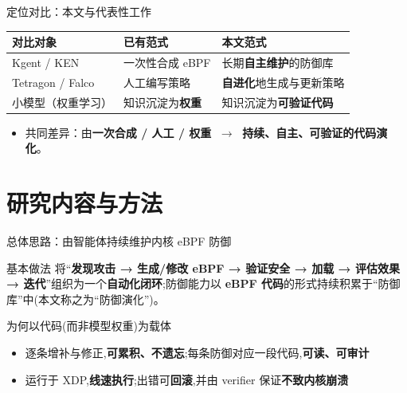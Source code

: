 \documentclass[aspectratio=169,10pt]{beamer}
\begin{document}
\begin{frame}{定位对比：本文与代表性工作}
    \begin{center}
    \renewcommand{\arraystretch}{1.35}
    \footnotesize\kaishu
    \begin{tabular}{>{\raggedright\arraybackslash}p{3.0cm}|>{\raggedright\arraybackslash}p{3.9cm}|>{\raggedright\arraybackslash}p{3.9cm}}
        \toprule
        \textbf{对比对象} & \textbf{已有范式} & \textbf{本文范式} \\
        \midrule
        Kgent / KEN\supercite{yang2024kgent} & 一次性合成 eBPF & \cellcolor{boxbg}长期\textbf{自主维护}的防御库 \\
        Tetragon / Falco\supercite{tetragon2022,falco2018} & 人工编写策略 & \cellcolor{boxbg}\textbf{自进化}地生成与更新策略 \\
        小模型（权重学习） & 知识沉淀为\textbf{权重} & \cellcolor{boxbg}知识沉淀为\textbf{可验证代码} \\
        \bottomrule
    \end{tabular}
    \end{center}
    \vspace{0.4em}
    \begin{itemize}
        \item 共同差异：由\textbf{一次合成 / 人工 / 权重} $\;\longrightarrow\;$ \textbf{持续、自主、可验证的代码演化}。
    \end{itemize}
\end{frame}


\section{研究内容与方法}

\begin{frame}{总体思路：由智能体持续维护内核 eBPF 防御}
    \begin{block}{基本做法}
        将“\textbf{发现攻击 → 生成/修改 eBPF → 验证安全 → 加载 → 评估效果 → 迭代}”组织为一个\textbf{自动化闭环};防御能力以 \textbf{eBPF 代码}的形式持续积累于“防御库”中(本文称之为“防御演化”)。
    \end{block}
    \vspace{0.2em}
    \begin{block}{为何以代码(而非模型权重)为载体}
        \begin{itemize}
            \item 逐条增补与修正,\textbf{可累积、不遗忘};每条防御对应一段代码,\textbf{可读、可审计}
            \item 运行于 XDP,\textbf{线速执行};出错可\textbf{回滚},并由 verifier 保证\textbf{不致内核崩溃}
        \end{itemize}
    \end{block}
\end{frame}
\end{document}
